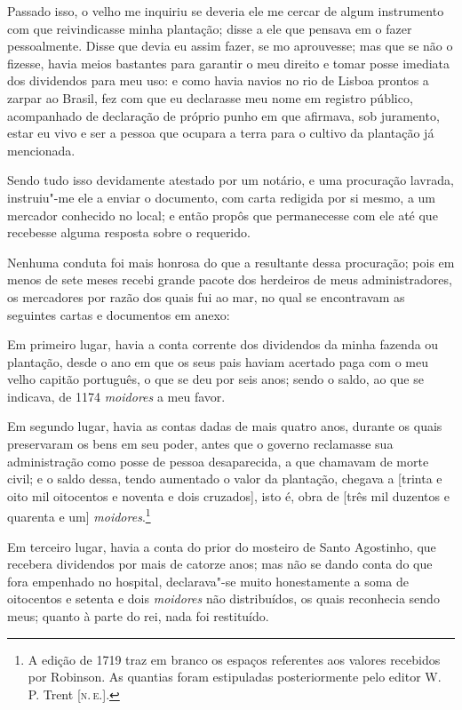 Passado isso, o velho me inquiriu se deveria ele me cercar de algum
instrumento com que reivindicasse minha plantação; disse a ele que
pensava em o fazer pessoalmente. Disse que devia eu assim fazer, se mo
aprouvesse; mas que se não o fizesse, havia meios bastantes para
garantir o meu direito e tomar posse imediata dos dividendos para meu
uso: e como havia navios no rio de Lisboa prontos a zarpar ao Brasil,
fez com que eu declarasse meu nome em registro público, acompanhado de
declaração de próprio punho em que afirmava, sob juramento, estar eu
vivo e ser a pessoa que ocupara a terra para o cultivo da plantação já
mencionada.

Sendo tudo isso devidamente atestado por um notário, e uma procuração
lavrada, instruiu"-me ele a enviar o documento, com carta redigida por si
mesmo, a um mercador conhecido no local; e então propôs que permanecesse
com ele até que recebesse alguma resposta sobre o requerido.

Nenhuma conduta foi mais honrosa do que a resultante dessa procuração;
pois em menos de sete meses recebi grande pacote dos herdeiros de meus
administradores, os mercadores por razão dos quais fui ao mar, no qual
se encontravam as seguintes cartas e documentos em anexo:

Em primeiro lugar, havia a conta corrente dos dividendos da minha
fazenda ou plantação, desde o ano em que os seus pais haviam acertado
paga com o meu velho capitão português, o que se deu por seis anos;
sendo o saldo, ao que se indicava, de 1174 \emph{moidores} a meu favor.

Em segundo lugar, havia as contas dadas de mais quatro anos, durante os
quais preservaram os bens em seu poder, antes que o governo reclamasse
sua administração como posse de pessoa desaparecida, a que chamavam de
morte civil; e o saldo dessa, tendo aumentado o valor da plantação,
chegava a {[}trinta e oito mil oitocentos e noventa e dois cruzados{]},
isto é, obra de {[}três mil duzentos e quarenta e um{]}
\emph{moidores}.\footnote{A edição de 1719 traz em branco os espaços
  referentes aos valores recebidos por Robinson. As quantias foram
  estipuladas posteriormente pelo editor W. P. Trent {[}\textsc{n.\,e.}{]}.}

Em terceiro lugar, havia a conta do prior do mosteiro de Santo
Agostinho, que recebera dividendos por mais de catorze anos; mas não se
dando conta do que fora empenhado no hospital, declarava"-se muito
honestamente a soma de oitocentos e setenta e dois \emph{moidores} não
distribuídos, os quais reconhecia sendo meus; quanto à parte do rei,
nada foi restituído.

